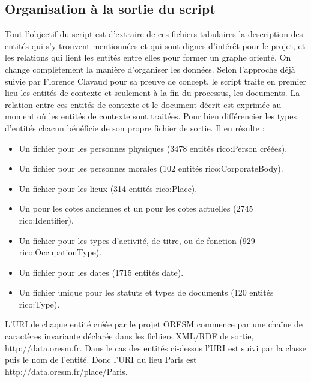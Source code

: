 \subsection{Organisation à la sortie du script}
Tout l'objectif du script est d'extraire de ces fichiers tabulaires la description des entités qui s'y trouvent mentionnées et qui sont dignes d'intérêt pour le projet, et les relations qui lient les entités entre elles pour former un graphe orienté. On change complètement la manière d'organiser les données. Selon l'approche déjà suivie par Florence Clavaud pour sa preuve de concept, le script traite en premier lieu les entités de contexte et seulement à la fin du processus, les documents. La relation entre ces entités de contexte et le document décrit est exprimée au moment où les entités de contexte sont traitées. Pour bien différencier les types d'entités chacun bénéficie de son propre fichier de sortie. Il en résulte :
\begin{itemize}
    \item Un fichier pour les personnes physiques (3478 entités rico:Person créées).
    \item Un fichier pour les personnes morales (102 entités rico:CorporateBody).
    \item Un fichier pour les lieux (314 entités rico:Place).
    \item Un pour les cotes anciennes et un pour les cotes actuelles (2745 rico:Identifier).
    \item Un fichier pour les types d'activité, de titre, ou de fonction (929 rico:OccupationType).
    \item Un fichier pour les dates (1715 entités date).
    \item Un fichier unique pour les statuts et types de documents (120 entités rico:Type).
\end{itemize}
\par
L'URI de chaque entité créée par le projet ORESM commence par une chaîne de caractères invariante déclarée dans les fichiers XML/RDF de sortie, \og  http://data.oresm.fr\fg. Dans le cas des entités ci-dessus l'URI est suivi par la classe puis le nom de l'entité. Donc  l'URI du lieu Paris est \og http://data.oresm.fr/place/Paris\fg. 
\par

